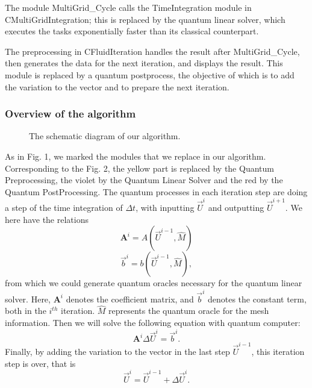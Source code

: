 \documentclass[%
 reprint,
 amsmath,amssymb,
pra,
]{revtex4-1}
\begin{document}
The module MultiGrid\_Cycle calls the TimeIntegration module in CMultiGridIntegration; this is replaced by the quantum linear solver, which executes the tasks exponentially faster than its classical counterpart.

The preprocessing in CFluidIteration handles the result after MultiGrid\_Cycle, then generates the data for the next iteration, and displays the result. This module is replaced by a quantum postprocess, the objective of which is to add the variation to the vector and to prepare the next iteration.

\subsubsection{Overview of the algorithm}

\begin{figure}[htbp]
    \caption{The schematic diagram of our algorithm. }
    \label{QuantumProcess1} 
\end{figure}

As in Fig. 1, we marked the modules that we replace in our algorithm. Corresponding to the Fig. 2, the yellow part is replaced by the Quantum Preprocessing, the violet by the Quantum Linear Solver and the red by the Quantum PostProcessing. The quantum processes in each iteration step are doing a step of the time integration of $\Delta t$, with inputting $\vec{U}^i$ and outputting $\vec{U}^{i+1}$. We here have the relations
\begin{equation}
\bm{A}^i=A(\vec{U}^{i-1},\hat{M})
\end{equation}
\begin{equation}
\vec{b}^i=b(\vec{U}^{i-1},\hat{M}),
\end{equation}
from which we could generate quantum oracles necessary for the quantum linear solver. Here, $\bm{A}^i$ denotes the coefficient matrix, and $\vec{b}^i$ denotes the constant term, both in the $i^{th}$ iteration. $\hat{M}$ represents the quantum oracle for the mesh information. Then we will solve the following equation with quantum computer:
\begin{equation}
\bm{A}^i\Delta \vec{U}^i=\vec{b}^i.
\end{equation}
Finally, by adding the variation to the vector in the last step $\vec{U}^{i-1}$, this iteration step is over, that is
\begin{equation}
\vec{U}^i=\vec{U}^{i-1}+\Delta \vec{U}^i.
\end{equation}
\end{document}
